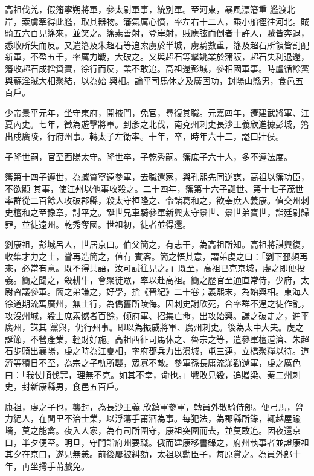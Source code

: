 \begin{pinyinscope}
 高祖伐羌，假籓寧朔將軍，參太尉軍事，統別軍。至河東，暴風漂籓重
 艦渡北岸，索虜牽得此艦，取其器物。籓氣厲心憤，率左右十二人，乘小船徑往河北。賊騎五六百見籓來，並笑之。籓素善射，登岸射，賊應弦而倒者十許人，賊皆奔退，悉收所失而反。又遣籓及朱超石等追索虜於半城，虜騎數重，籓及超石所領皆割配新軍，不盈五千，率厲力戰，大破之。又與超石等擊姚業於蒲阪，超石失利退還，籓收超石成捨資實，徐行而反，業不敢追。高祖還彭城，參相國軍事。時盧循餘黨與蘇淫賊大相聚結，以為始
 興相。論平司馬休之及廣固功，封陽山縣男，食邑五百戶。



 少帝景平元年，坐守東府，開掖門，免官，尋復其職。元嘉四年，遷建武將軍、江夏內史。七年，徵為遊擊將軍。到彥之北伐，南兗州刺史長沙王義欣進據彭城，籓出戍廣陵，行府州事。轉太子左衛率。十年，卒，時年六十二，謚曰壯侯。



 子隆世嗣，官至西陽太守。隆世卒，子乾秀嗣。籓庶子六十人，多不遵法度。



 籓第十四子遵世，為臧質寧遠參軍，去職還家，與孔熙先同逆謀，高祖以籓功臣，不欲顯
 其事，使江州以他事收殺之。二十四年，籓第十六子誕世、第十七子茂世率群從二百餘人攻破郡縣，殺太守桓隆之、令諸葛和之，欲奉庶人義康。值交州刺史檀和之至豫章，討平之。誕世兄車騎參軍新興太守景世、景世弟寶世，詣廷尉歸罪，並徙遠州。乾秀奪國。世祖初，徙者並得還。



 劉康祖，彭城呂人，世居京口。伯父簡之，有志干，為高祖所知。高祖將謀興復，收集才力之士，嘗再造簡之，值有
 賓客。簡之悟其意，謂弟虔之曰：「劉下邳頻再來，必當有意。既不得共語，汝可試往見之。」既至，高祖已克京城，虔之即便投義。簡之聞之，殺耕牛，會聚徒眾，率以赴高祖。簡之歷官至通直常侍，少府，太尉咨議參軍。簡之弟謙之，好學，撰《晉紀》二十卷；義熙末，為始興相。東海人徐道期流寓廣州，無士行，為僑舊所陵侮。因刺史謝欣死，合率群不逞之徒作亂，攻沒州城，殺士庶素憾者百餘，傾府軍、招集亡命，出攻始興。謙之破走之，進平廣州，誅其
 黨與，仍行州事。即以為振威將軍、廣州刺史。後為太中大夫。虔之誕節，不營產業，輕財好施。高祖西征司馬休之、魯宗之等，遣參軍檀道濟、朱超石步騎出襄陽，虔之時為江夏相，率府郡兵力出溳城，屯三連，立橋聚糧以待。道濟等積日不至，為宗之子軌所襲，眾寡不敵。參軍孫長庸流涕勸還軍，虔之厲色曰：「我仗順伐罪，理無不克。如其不幸，命也。」戰敗見殺，追贈梁、秦二州刺史，封新康縣男，食邑五百戶。



 康祖，虔之子也，襲封，為長沙王義
 欣鎮軍參軍，轉員外散騎侍郎。便弓馬，膂力絕人，在閭里不治士業，以浮蕩手莆酒為事。每犯法，為郡縣所錄，輒越屋踰墻，莫之能禽。夜入人家，為有司所圍守，康祖突圍而去，並莫敢追。因夜還京口，半夕便至。明旦，守門詣府州要職。俄而建康移書錄之，府州執事者並證康祖其夕在京口，遂見無恙。前後屢被糾劾，太祖以勳臣子，每原貸之。為員外郎十年，再坐摴手莆戲免。




\end{pinyinscope}
